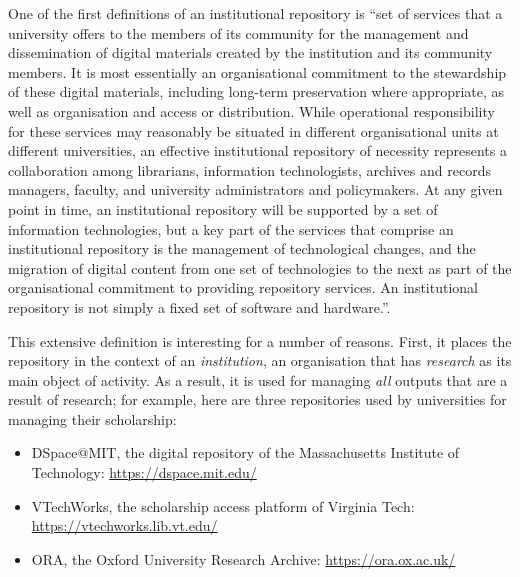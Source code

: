 One of the first definitions of an institutional repository is ``set of services that a university offers to the members of its community for the management and dissemination of digital materials created by the institution and its community members. It is most essentially an organisational commitment to the stewardship of these digital materials, including long-term preservation where appropriate, as well as organisation and access or distribution. While operational responsibility for these services may reasonably be situated in different organisational units at different universities, an effective institutional repository of necessity represents a collaboration among librarians, information technologists, archives and records managers, faculty, and university administrators and policymakers. At any given point in time, an institutional repository will be supported by a set of information technologies, but a key part of the services that comprise an institutional repository is the management of technological changes, and the migration of digital content from one set of technologies to the next as part of the organisational commitment to providing repository services. An institutional repository is not simply a fixed set of software and hardware.''\cite{lynch}.

This extensive definition is interesting for a number of reasons. First, it places the repository in the context of an \emph{institution}, an organisation that has \emph{research} as its main object of activity. As a result, it is used for managing \emph{all} outputs that are a result of research; for example, here are three repositories used by universities for managing their scholarship:
\begin{itemize}
    \item DSpace@MIT, the digital repository of the Massachusetts Institute of Technology: \url{https://dspace.mit.edu/}
    \item VTechWorks, the scholarship access platform of Virginia Tech: \url{https://vtechworks.lib.vt.edu/}
    \item ORA, the Oxford University Research Archive: \url{https://ora.ox.ac.uk/}
\end{itemize}

